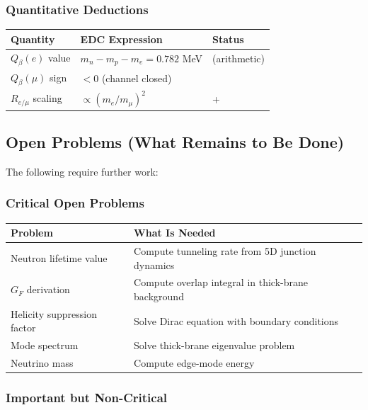 \subsubsection{Quantitative Deductions}

\begin{center}
\begin{tabular}{p{4cm}p{5cm}p{4cm}}
\toprule
\textbf{Quantity} & \textbf{EDC Expression} & \textbf{Status} \\
\midrule
$Q_\beta(e)$ value & $m_n - m_p - m_e = 0.782$ MeV & \tagDc{} (arithmetic) \\
$Q_\beta(\mu)$ sign & $< 0$ (channel closed) & \tagDc{} \\
$R_{e/\mu}$ scaling & $\propto (m_e/m_\mu)^2$ & \tagBL{} + \tagP{} \\
\bottomrule
\end{tabular}
\end{center}

\subsection{Open Problems (What Remains to Be Done)}

The following require further work:

\subsubsection{Critical Open Problems}

\begin{center}
\begin{tabular}{p{5cm}p{8cm}}
\toprule
\textbf{Problem} & \textbf{What Is Needed} \\
\midrule
Neutron lifetime value & Compute tunneling rate from 5D junction dynamics \\
$G_F$ derivation & Compute overlap integral in thick-brane background \\
Helicity suppression factor & Solve Dirac equation with boundary conditions \\
Mode spectrum & Solve thick-brane eigenvalue problem \\
Neutrino mass & Compute edge-mode energy \\
\bottomrule
\end{tabular}
\end{center}

\subsubsection{Important but Non-Critical}

